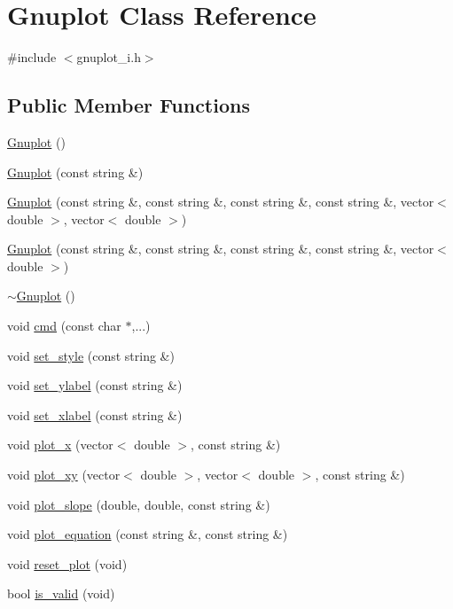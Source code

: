 \hypertarget{class_gnuplot}{}\section{Gnuplot Class Reference}
\label{class_gnuplot}


{\ttfamily \#include $<$gnuplot\+\_\+i.\+h$>$}

\subsection*{Public Member Functions}
\begin{DoxyCompactItemize}
\item 
\hyperlink{class_gnuplot_a936d27de7b6f57d1f3d61491dc70f1ae}{Gnuplot} ()
\item 
\hyperlink{class_gnuplot_a4acdc327a6a9eb3c4ab3f37814dce26e}{Gnuplot} (const string \&)
\item 
\hyperlink{class_gnuplot_a93344aa5bd86c3ee4ab37aaa6bff92e0}{Gnuplot} (const string \&, const string \&, const string \&, const string \&, vector$<$ double $>$, vector$<$ double $>$)
\item 
\hyperlink{class_gnuplot_a22ec497060171153b0ce321763e9c7f9}{Gnuplot} (const string \&, const string \&, const string \&, const string \&, vector$<$ double $>$)
\item 
\hyperlink{class_gnuplot_a78a68f621caa87d1f34324fcd093c7bd}{$\sim$\+Gnuplot} ()
\item 
void \hyperlink{class_gnuplot_a6f299285af0a0ee2cf1722c469aa1a57}{cmd} (const char $\ast$,...)
\item 
void \hyperlink{class_gnuplot_accdd7b69237ead4109c74e1e440c185f}{set\+\_\+style} (const string \&)
\item 
void \hyperlink{class_gnuplot_af85dd1d368699914112460285ead0fde}{set\+\_\+ylabel} (const string \&)
\item 
void \hyperlink{class_gnuplot_ac9b0c04d47e375eb82f50437eda5e46e}{set\+\_\+xlabel} (const string \&)
\item 
void \hyperlink{class_gnuplot_ae3b7c28efb53f636431b9655085906be}{plot\+\_\+x} (vector$<$ double $>$, const string \&)
\item 
void \hyperlink{class_gnuplot_a1e817a58ef3e40ceaeb128c7e6437e8a}{plot\+\_\+xy} (vector$<$ double $>$, vector$<$ double $>$, const string \&)
\item 
void \hyperlink{class_gnuplot_a80c9d9e6bc3e64db073d9d39d6ec5d5f}{plot\+\_\+slope} (double, double, const string \&)
\item 
void \hyperlink{class_gnuplot_a55e6430f1329bf8a66f155dcacb9d112}{plot\+\_\+equation} (const string \&, const string \&)
\item 
void \hyperlink{class_gnuplot_ad54976652afe30231a850dd31e1ca70f}{reset\+\_\+plot} (void)
\item 
bool \hyperlink{class_gnuplot_a0daaf54cd8e41dbbd574722f3a831cfd}{is\+\_\+valid} (void)
\end{DoxyCompactItemize}
